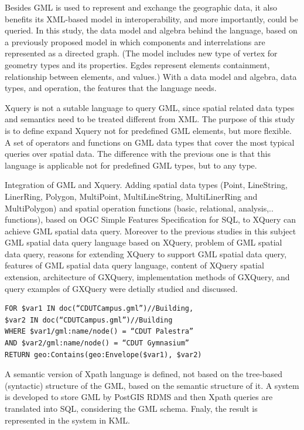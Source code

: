 \cite{corcoles2001} Besides GML is used to represent and exchange 
the geographic data, it also benefits its XML-based model in interoperability, 
and more importantly, could be queried. In this study, the data model 
and algebra behind the language, based on a previously proposed model 
in which components and interrelations are represented as a directed graph. 
(The model includes new type of vertex for geometry types and its properties. 
Egdes represent elements containment, relationship between elements, and values.) 
With a data model and algebra, data types, and operation, the features that the language needs.

\cite{Lisa2006} Xquery is not a sutable language to query GML, 
since spatial related data types and semantics need to be treated different from XML. 
The purpose of this study is to define expand Xquery not for predefined GML elements, 
but more flexible.  A set of operators and functions on GML data types that cover 
the most typical queries over spatial data. The difference with the previous one is 
that this language is applicable not for predefined GML types, but to any type.

\cite{Chen2010} Integration of GML and Xquery. Adding spatial data types 
(Point, LineString, LinerRing, Polygon, MultiPoint, MultiLineString, MultiLinerRing 
and MultiPolygon) and spatial operation functions (basic, relational, analysis,.. functions), 
based on OGC Simple Features Specification for SQL, to XQuery can achieve GML spatial data query. 
Moreover to the previous studies in this subject GML spatial data query language 
based on XQuery, problem of GML spatial data query, reasons for extending XQuery to
support GML spatial data query, features of GML spatial data query language, 
content of XQuery spatial extension, architecture of GXQuery, implementation methods 
of GXQuery, and query examples of GXQuery were detially studied and discussed. 

\begin{verbatim}
FOR $var1 IN doc(“CDUTCampus.gml”)//Building,
$var2 IN doc(“CDUTCampus.gml”)//Building
WHERE $var1/gml:name/node() = “CDUT Palestra”
AND $var2/gml:name/node() = “CDUT Gymnasium”
RETURN geo:Contains(geo:Envelope($var1), $var2)
\end{verbatim}

\cite{Alemdros2013} A semantic version of Xpath language is defined, not based on the tree-based (syntactic) structure of the GML, based on the semantic structure of it.
A system is developed to store GML by PostGIS RDMS and then Xpath queries are translated into SQL, considering the GML schema. Fnaly, the result is represented in the system in KML.

